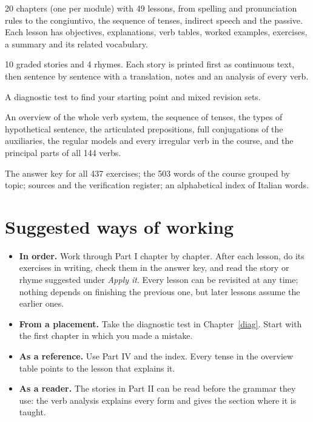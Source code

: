 \documentclass[11pt,a4paper,twoside,openright]{book}
\begin{document}
\begin{description}[leftmargin=0pt,itemsep=3pt]
\item[Part I, Course.] 20 chapters (one per module) with 49 lessons, from spelling and pronunciation rules to the congiuntivo, the sequence of tenses, indirect speech and the passive. Each lesson has objectives, explanations, verb tables, worked examples, exercises, a summary and its related vocabulary.
\item[Part II, Reader.] 10 graded stories and 4 rhymes. Each story is printed first as continuous text, then sentence by sentence with a translation, notes and an analysis of every verb.
\item[Part III, Practice.] A diagnostic test to find your starting point and mixed revision sets.
\item[Part IV, Grammar reference.] An overview of the whole verb system, the sequence of tenses, the types of hypothetical sentence, the articulated prepositions, full conjugations of the auxiliaries, the regular models and every irregular verb in the course, and the principal parts of all 144 verbs.
\item[Appendices.] The answer key for all 437 exercises; the 503 words of the course grouped by topic; sources and the verification register; an alphabetical index of Italian words.
\end{description}

\section*{Suggested ways of working}

\begin{itemize}
\item \textbf{In order.} Work through Part I chapter by chapter. After each lesson, do its exercises in writing, check them in the answer key, and read the story or rhyme suggested under \emph{Apply it}. Every lesson can be revisited at any time; nothing depends on finishing the previous one, but later lessons assume the earlier ones.
\item \textbf{From a placement.} Take the diagnostic test in Chapter~\ref{diag}. Start with the first chapter in which you made a mistake.
\item \textbf{As a reference.} Use Part IV and the index. Every tense in the overview table points to the lesson that explains it.
\item \textbf{As a reader.} The stories in Part II can be read before the grammar they use: the verb analysis explains every form and gives the section where it is taught.
\end{itemize}
\end{document}
